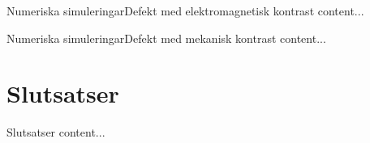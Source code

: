 \documentclass[11pt]{beamer}
\begin{document}
	\begin{frame}{Numeriska simuleringar}{Defekt med elektromagnetisk kontrast}
		content...
	\end{frame}
	
	\begin{frame}{Numeriska simuleringar}{Defekt med mekanisk kontrast}
		content...
	\end{frame}
	
	\section{Slutsatser}
	
	\begin{frame}{Slutsatser}
		content...
	\end{frame}
\end{document}

